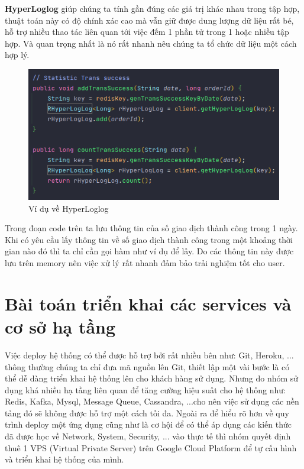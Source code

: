                 \textbf{HyperLoglog} giúp chúng ta tính gần đúng các giá trị khác nhau trong tập hợp, thuật toán này có độ chính xác cao mà vẫn giữ được dung lượng dữ liệu rất bé, hỗ trợ nhiều thao tác liên quan tới việc đếm 1 phần tử trong 1 hoặc nhiều tập hợp. Và quan trọng nhất là nó rất nhanh nêu chúng ta tổ chức dữ liệu một cách hợp lý.\\
                
                \begin{figure}[H]
			    \includegraphics[width=1\textwidth]{Images/hyperloglog.png}
			    \centering
			    \linebreak
			    \caption{Ví dụ về HyperLoglog}
	       	    \end{figure}
	       	
	       	    Trong đoạn code trên ta lưu thông tin của số giao dịch thành công trong 1 ngày. Khi có yêu cầu lấy thông tin về số giao dịch thành công trong một khoảng thời gian nào đó thì ta chỉ cần gọi hàm như ví dụ để lấy. Do các thông tin này được lưu trên memory nên việc xử lý rất nhanh đảm bảo trải nghiệm tốt cho user.
		  
		  \section{Bài toán triển khai các services và cơ sở hạ tầng}
		 
		  
		  Việc deploy hệ thống có thể được hỗ trợ bởi rất nhiều bên như: Git, Heroku, ... thông thường chúng ta chỉ đưa mã nguồn lên Git, thiết lập một vài bước là có thể dễ dàng triển khai hệ thống lên cho khách hàng sử dụng. Nhưng do nhóm sử dụng khá nhiều hạ tầng liên quan để tăng cường hiệu suất cho hệ thống như: Redis, Kafka, Mysql, Message Queue, Cassandra, ...cho nên việc sử dụng các nền tảng đó sẽ không được hỗ trợ một cách tối đa. Ngoài ra để hiểu rõ hơn về quy trình deploy một ứng dụng cũng như là cơ hội để có thể áp dụng các kiến thức đã được học về Network, System, Security, ... vào thực tế thì nhóm quyết định thuê 1 VPS (Virtual Private Server) trên Google Cloud Platform để tự cấu hình và triển khai hệ thống của mình.\\
		  

